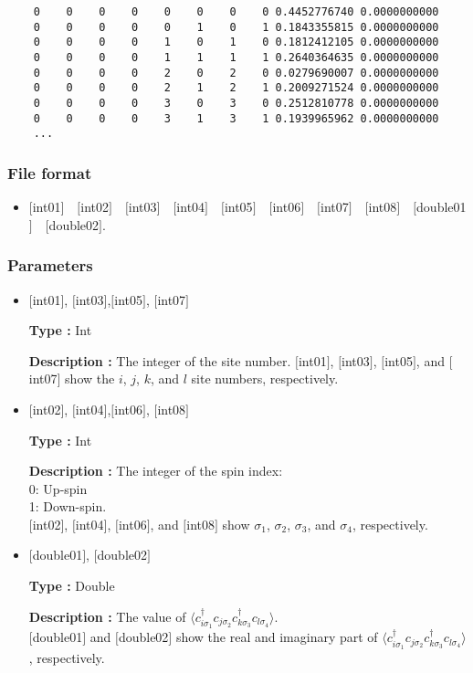 \begin{minipage}{15cm}
\begin{screen}
\begin{verbatim}
    0    0    0    0    0    0    0    0 0.4452776740 0.0000000000
    0    0    0    0    0    1    0    1 0.1843355815 0.0000000000
    0    0    0    0    1    0    1    0 0.1812412105 0.0000000000
    0    0    0    0    1    1    1    1 0.2640364635 0.0000000000
    0    0    0    0    2    0    2    0 0.0279690007 0.0000000000
    0    0    0    0    2    1    2    1 0.2009271524 0.0000000000
    0    0    0    0    3    0    3    0 0.2512810778 0.0000000000
    0    0    0    0    3    1    3    1 0.1939965962 0.0000000000
    ...
\end{verbatim}
\end{screen}
\end{minipage}

\subsubsection{File format}
 \begin{itemize}
   \item  $[$int01$]$~~$[$int02$]$~~$[$int03$]$~~$[$int04$]$~~$[$int05$]$~~$[$int06$]$~~$[$int07$]$~~$[$int08$]$~~$[$double01$]$~~$[$double02$]$.
  \end{itemize}


\subsubsection{Parameters}
 \begin{itemize}

 \item  $[$int01$]$, $[$int03$]$,$[$int05$]$, $[$int07$]$

 {\bf Type :} Int

{\bf Description :} 
The integer of the site number. $[$int01$]$, $[$int03$]$, $[$int05$]$, and $[$int07$]$  show the $i$, $j$, $k$, and $l$ site numbers, respectively.
 
  \item  $[$int02$]$, $[$int04$]$,$[$int06$]$, $[$int08$]$

 {\bf Type :} Int 

{\bf Description :} The integer of the spin index:\\
   0: Up-spin\\
   1: Down-spin.\\ 
$[$int02$]$, $[$int04$]$, $[$int06$]$, and $[$int08$]$ show $\sigma_1$, $\sigma_2$, $\sigma_3$, and $\sigma_4$,  respectively. 

 \item  $[$double01$]$, $[$double02$]$

 {\bf Type :} Double 

{\bf Description :} The value of $\langle c_{i\sigma_1}^{\dagger}c_{j\sigma_2}c_{k\sigma_3}^{\dagger}c_{l\sigma_4}\rangle$.\\
$[$double01$]$ and $[$double02$]$ show the real and imaginary part of $\langle c_{i\sigma_1}^{\dagger}c_{j\sigma_2}c_{k\sigma_3}^{\dagger}c_{l\sigma_4}\rangle$, respectively.

\end{itemize}

